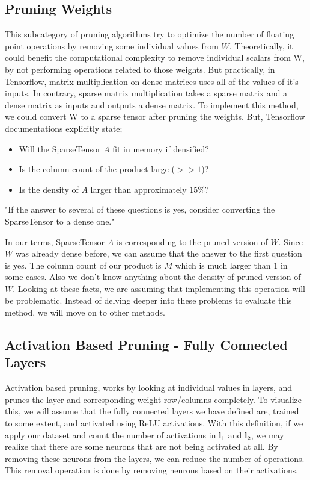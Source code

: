 \subsection{Pruning Weights}
This subcategory of pruning algorithms try to optimize the number of floating point operations by removing some individual values from $W$. Theoretically, it could benefit the computational complexity to remove individual scalars from W, by not performing operations related to those weights. But practically, in Tensorflow, matrix multiplication on dense matrices uses all of the values of it's inputs. In contrary, sparse matrix multiplication takes a sparse matrix and a dense matrix as inputs and outputs a dense matrix. To implement this method, we could convert W to a sparse tensor after pruning the weights. But, Tensorflow documentations explicitly state;
\begin{displayquote}
\begin{itemize}
\item Will the SparseTensor $A$ fit in memory if densified?
\item Is the column count of the product large ($>> 1$)?
\item Is the density of $A$ larger than approximately $15\%$?
\end{itemize}
"If the answer to several of these questions is yes, consider converting the SparseTensor to a dense one."
\end{displayquote}
In our terms, SparseTensor $A$ is corresponding to the pruned version of $W$. Since $W$ was already dense before, we can assume that the answer to the first question is yes. The column count of our product is $M$ which is much larger than $1$ in some cases. Also we don't know anything about the density of pruned version of $W$. Looking at these facts, we are assuming that implementing this operation will be problematic. Instead of delving deeper into these problems to evaluate this method, we will move on to other methods.
\subsection{Activation Based Pruning - Fully Connected Layers} \label{sec:activation-based-pruning-convolution}
Activation based pruning, works by looking at individual values in layers, and prunes the layer and corresponding weight row/columns completely. To visualize this, we will assume that the fully connected layers we have defined are, trained to some extent, and activated using ReLU activations. With this definition, if we apply our dataset and count the number of activations in $\mathbf{l_1}$ and $\mathbf{l_2}$, we may realize that there are some neurons that are not being activated at all. By removing these neurons from the layers, we can reduce the number of operations. This removal operation is done by removing neurons based on their activations. 

